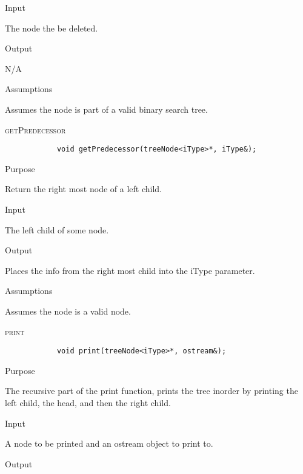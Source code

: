 \documentclass[pdftex, 12pt]{article}
\begin{document}
\begin{description}
\begin{description}
			\item{Input}

				The node the be deleted.

			\item{Output}

				N/A

			\item{Assumptions}

				Assumes the node is part of a valid binary search tree.

		\end{description}
	\item{\textsc{getPredecessor}}
		\begin{lstlisting}
			void getPredecessor(treeNode<iType>*, iType&);
		\end{lstlisting}
		\begin{description}

			\item{Purpose}

				Return the right most node of a left child.

			\item{Input}

				The left child of some node.

			\item{Output}

				Places the info from the right most child into the iType parameter.

			\item{Assumptions}

				Assumes the node is a valid node.

		\end{description}
	\item{\textsc{print}}
		\begin{lstlisting}
			void print(treeNode<iType>*, ostream&);
		\end{lstlisting}
		\begin{description}

			\item{Purpose}
				
				The recursive part of the print function, prints the tree inorder by printing the left child, the head,
				and then the right child.

			\item{Input}

				A node to be printed and an ostream object to print to.

			\item{Output}


\end{description}
\end{description}
\end{document}
